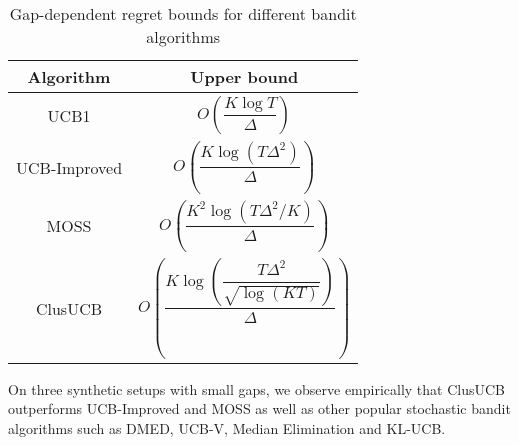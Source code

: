 \begin{table}
\caption{Gap-dependent regret bounds for different bandit algorithms}
\label{tab:regret-bds}
\begin{center}
\begin{tabular}{|c|c|}
\toprule
Algorithm  & Upper bound \\
\midrule
UCB1         &$O\left(\dfrac{K\log T}{\Delta}\right)$ \\\midrule
UCB-Improved &$O\left(\dfrac{K\log (T\Delta^{2})}{\Delta}\right)$ \\\midrule
MOSS	     &$O\left(\dfrac{K^{2}\log\left(T\Delta^{2}/K\right)}{\Delta}\right)$\\\midrule
ClusUCB      &$O\left(\dfrac{K\log\left(\dfrac{T\Delta^{2}}{\sqrt{\log (KT)}}\right)}{\Delta}\right)$\\\bottomrule
\end{tabular}
\end{center}
\end{table}


On three synthetic setups with small gaps, we observe empirically that ClusUCB outperforms UCB-Improved\cite{auer2010ucb} and MOSS\cite{audibert2009minimax} as well as other popular stochastic bandit algorithms such as DMED\cite{honda2010asymptotically}, UCB-V\cite{audibert2009exploration}, Median Elimination\cite{even2006action} and KL-UCB\cite{garivier2011kl}.

	

